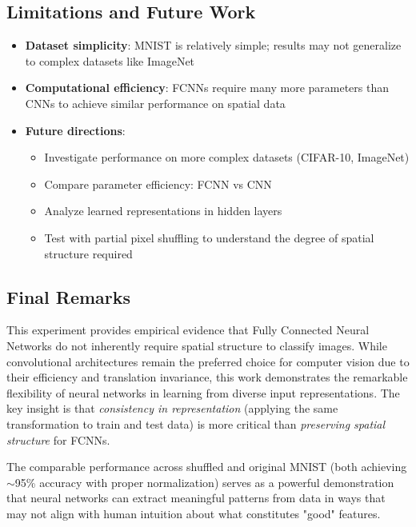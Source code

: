 \documentclass[11pt,a4paper]{article}
\begin{document}
\subsection{Limitations and Future Work}

\begin{itemize}
    \item \textbf{Dataset simplicity}: MNIST is relatively simple; results may not generalize to complex datasets like ImageNet
    
    \item \textbf{Computational efficiency}: FCNNs require many more parameters than CNNs to achieve similar performance on spatial data
    
    \item \textbf{Future directions}: 
    \begin{itemize}
        \item Investigate performance on more complex datasets (CIFAR-10, ImageNet)
        \item Compare parameter efficiency: FCNN vs CNN
        \item Analyze learned representations in hidden layers
        \item Test with partial pixel shuffling to understand the degree of spatial structure required
    \end{itemize}
\end{itemize}

\subsection{Final Remarks}

This experiment provides empirical evidence that Fully Connected Neural Networks do not inherently require spatial structure to classify images. While convolutional architectures remain the preferred choice for computer vision due to their efficiency and translation invariance, this work demonstrates the remarkable flexibility of neural networks in learning from diverse input representations. The key insight is that \textit{consistency in representation} (applying the same transformation to train and test data) is more critical than \textit{preserving spatial structure} for FCNNs.

The comparable performance across shuffled and original MNIST (both achieving $\sim$95\% accuracy with proper normalization) serves as a powerful demonstration that neural networks can extract meaningful patterns from data in ways that may not align with human intuition about what constitutes "good" features.
\end{document}
